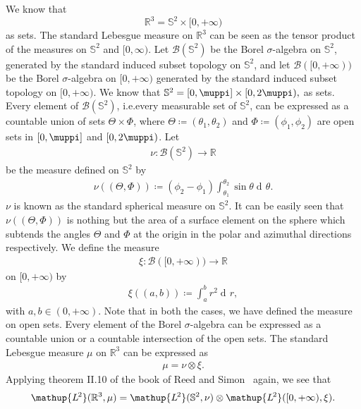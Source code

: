 \documentclass[12pt, a4 paper]{article}
\theoremstyle{definition}
\newcommand{\ltwo}{\mathup{L\kern-0.7pt^2}}
\newcommand{\rthree}{\mathbb{R}^3}
\newcommand{\rr}{\mathbb{R}}
\renewcommand{\pi}{\muppi}
\newcommand{\der}{\operatorname{d\!}{}}
\begin{document}
	We know that \[\rthree = \mathbb{S}^2 \times [0, +\infty)\] as sets. The standard Lebesgue measure on $\rthree$ can be seen as the tensor product of the measures on $\mathbb{S}^2$ and $[0, \infty)$. Let $\mathcal{B}(\mathbb{S}^2)$ be the Borel $\sigma$-algebra on $\mathbb{S}^2$, generated by the standard induced subset topology on $\mathbb{S}^2$, and let $\mathcal{B}([0,+\infty))$ be the Borel $\sigma$-algebra on $[0, +\infty)$ generated by the standard induced subset topology on $[0, +\infty)$. We know that $\mathbb{S}^2 = [0, \pi] \times [0, 2\pi),$ as sets. Every element of $\mathcal{B}(\mathbb{S}^2)$, i.e.\@ every measurable set of $\mathbb{S}^2$, can be expressed as a countable union of sets $\Theta \times \Phi$, where $\Theta \coloneq (\theta_1, \theta_2)$ and $\Phi \coloneq (\phi_1, \phi_2)$ are open sets in $[0, \pi]$ and $[0, 2\pi)$. Let
	\begin{align*}
		\nu \colon \mathcal{B}(\mathbb{S}^2) \rightarrow \rr
	\end{align*}
	be the measure defined on $\mathbb{S}^2$ by
	\begin{align*}
	    \nu((\Theta, \Phi)) \coloneq (\phi_2 - \phi_1) \int_{\theta_1}^{\theta_2}\sin{\theta}\der \theta.
	\end{align*}
	$\nu$ is known as the standard spherical measure on $\mathbb{S}^2$. It can be easily seen that $\nu((\Theta, \Phi))$ is nothing but the area of a surface element on the sphere which subtends the angles $\Theta$ and $\Phi$ at the origin in the polar and azimuthal directions respectively. We define the measure
	\begin{align*}
		\xi \colon \mathcal{B}([0, +\infty)) \rightarrow \rr
	\end{align*}
	on $[0, +\infty)$ by
	\begin{align*}
		\xi((a, b)) \coloneq \int_a^b r^2\! \der r,
	\end{align*}
	with $a, b \in (0, +\infty)$. Note that in both the cases, we have defined the measure on open sets. Every element of the Borel $\sigma$-algebra can be expressed as a countable union or a countable intersection of the open sets. The standard Lebesgue measure $\mu$ on $\rthree$ can be expressed as
	\begin{align*}
		\mu = \nu \otimes \xi.
	\end{align*}
	Applying theorem II.10 of the book of Reed and Simon~\cite[p.~52]{Reed} again, we see that
	\begin{align}
		\ltwo(\rthree, \mu) = \ltwo(\mathbb{S}^2, \nu) \otimes \ltwo([0, +\infty), \xi).
	\end{align}
\end{document}
